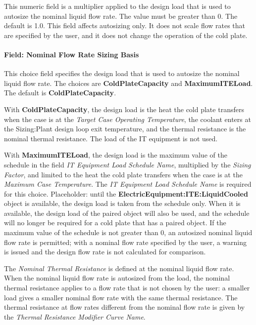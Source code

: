 This numeric field is a multiplier applied to the design load that is used to autosize the nominal liquid flow rate. The value must be greater than 0. The default is 1.0. This field affects autosizing only. It does not scale flow rates that are specified by the user, and it does not change the operation of the cold plate.

\paragraph{Field: Nominal Flow Rate Sizing Basis}\label{field-nominal-flow-rate-sizing-basis-coilcoolingitecoldplate}

This choice field specifies the design load that is used to autosize the nominal liquid flow rate. The choices are \textbf{ColdPlateCapacity} and \textbf{MaximumITELoad}. The default is \textbf{ColdPlateCapacity}.

With \textbf{ColdPlateCapacity}, the design load is the heat the cold plate transfers when the case is at the \emph{Target Case Operating Temperature}, the coolant enters at the Sizing:Plant design loop exit temperature, and the thermal resistance is the nominal thermal resistance. The load of the IT equipment is not used.

With \textbf{MaximumITELoad}, the design load is the maximum value of the schedule in the field \emph{IT Equipment Load Schedule Name}, multiplied by the \emph{Sizing Factor}, and limited to the heat the cold plate transfers when the case is at the \emph{Maximum Case Temperature}. The \emph{IT Equipment Load Schedule Name} is required for this choice. Placeholder: until the \textbf{ElectricEquipment:ITE:LiquidCooled} object is available, the design load is taken from the schedule only. When it is available, the design load of the paired object will also be used, and the schedule will no longer be required for a cold plate that has a paired object. If the maximum value of the schedule is not greater than 0, an autosized nominal liquid flow rate is permitted; with a nominal flow rate specified by the user, a warning is issued and the design flow rate is not calculated for comparison.

The \emph{Nominal Thermal Resistance} is defined at the nominal liquid flow rate. When the nominal liquid flow rate is autosized from the load, the nominal thermal resistance applies to a flow rate that is not chosen by the user: a smaller load gives a smaller nominal flow rate with the same thermal resistance. The thermal resistance at flow rates different from the nominal flow rate is given by the \emph{Thermal Resistance Modifier Curve Name}.

